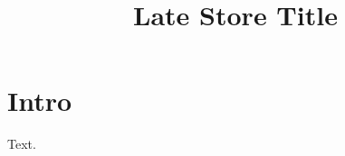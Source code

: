 \documentclass{article}
\title{Late Store Title}
\begin{document}
\section{Intro}
Text.
\begin{center}{\Large \@title\par}\end{center}
\end{document}
